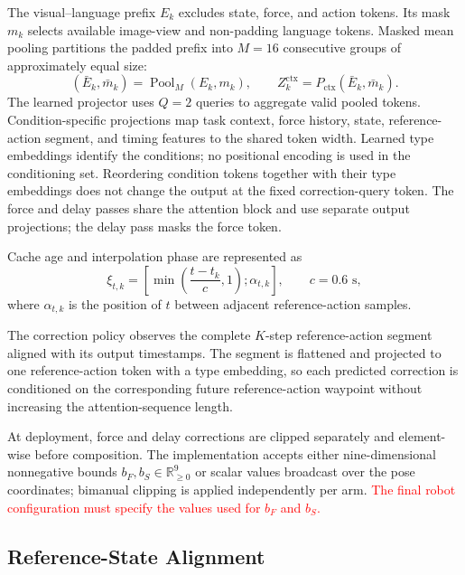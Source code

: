 \documentclass[conference]{IEEEtran}
\newcommand{\assumed}[1]{\textcolor{red}{#1}}
\begin{document}
The visual--language prefix $E_k$ excludes state, force, and action tokens. Its mask $m_k$ selects available image-view and non-padding language tokens. Masked mean pooling partitions the padded prefix into $M=16$ consecutive groups of approximately equal size:
\begin{equation}
    (\bar E_k,\bar m_k)=\operatorname{Pool}_M(E_k,m_k),
    \qquad Z_k^{\mathrm{ctx}}=P_{\mathrm{ctx}}(\bar E_k,\bar m_k).
\end{equation}
The learned projector uses $Q=2$ queries to aggregate valid pooled tokens. Condition-specific projections map task context, force history, state, reference-action segment, and timing features to the shared token width. Learned type embeddings identify the conditions; no positional encoding is used in the conditioning set. Reordering condition tokens together with their type embeddings does not change the output at the fixed correction-query token. The force and delay passes share the attention block and use separate output projections; the delay pass masks the force token.

Cache age and interpolation phase are represented as
\begin{equation}
    \xi_{t,k}=\left[\min\!\left(\frac{t-t_k}{c},1\right);\alpha_{t,k}\right],
    \qquad c=0.6\text{ s},
\end{equation}
where $\alpha_{t,k}$ is the position of $t$ between adjacent reference-action samples.

The correction policy observes the complete $K$-step reference-action segment aligned with its output timestamps. The segment is flattened and projected to one reference-action token with a type embedding, so each predicted correction is conditioned on the corresponding future reference-action waypoint without increasing the attention-sequence length.

At deployment, force and delay corrections are clipped separately and element-wise before composition. The implementation accepts either nine-dimensional nonnegative bounds $b_F,b_S\in\mathbb R_{\geq0}^{9}$ or scalar values broadcast over the pose coordinates; bimanual clipping is applied independently per arm. \assumed{The final robot configuration must specify the values used for $b_F$ and $b_S$.}

\subsection{Reference-State Alignment}
\end{document}
